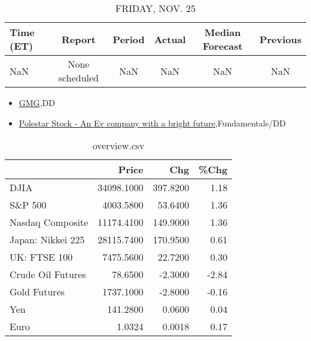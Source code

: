 \documentclass{article}%
\begin{document}
%


\begin{table}[htbp]%
\caption{FRIDAY, NOV. 25}%
\centering%
\begin{adjustbox}{width=1\textwidth}%
\begin{tabular}{lccccc}
\toprule
Time (ET) &         Report & Period & Actual & Median Forecast & Previous \\
\midrule
      NaN & None scheduled &    NaN &    NaN &             NaN &      NaN \\
\bottomrule
\end{tabular}
%
\end{adjustbox}%
\end{table}

%
\begin{itemize}%
\item%
\href{https://reddit.com/r/Baystreetbets/comments/z28i8j/gmg/}{GMG},DD%
\item%
\href{https://reddit.com/r/StockMarket/comments/z2lwhl/polestar\_stock\_an\_ev\_company\_with\_a\_bright\_future/}{Polestar Stock - An Ev company with a bright future},Fundamentals/DD%
\end{itemize}%


\begin{table}[htbp]%
\caption{overview.csv}%
\centering%
\begin{adjustbox}{width=1\textwidth}%
\begin{tabular}{lrrr}
\toprule
                  &      Price &      Chg &  \%Chg \\
\midrule
             DJIA & 34098.1000 & 397.8200 &  1.18 \\
          S\&P 500 &  4003.5800 &  53.6400 &  1.36 \\
 Nasdaq Composite & 11174.4100 & 149.9000 &  1.36 \\
Japan: Nikkei 225 & 28115.7400 & 170.9500 &  0.61 \\
     UK: FTSE 100 &  7475.5600 &  22.7200 &  0.30 \\
Crude Oil Futures &    78.6500 &  -2.3000 & -2.84 \\
     Gold Futures &  1737.1000 &  -2.8000 & -0.16 \\
              Yen &   141.2800 &   0.0600 &  0.04 \\
             Euro &     1.0324 &   0.0018 &  0.17 \\
\bottomrule
\end{tabular}
%
\end{adjustbox}%
\end{table}
\end{document}
